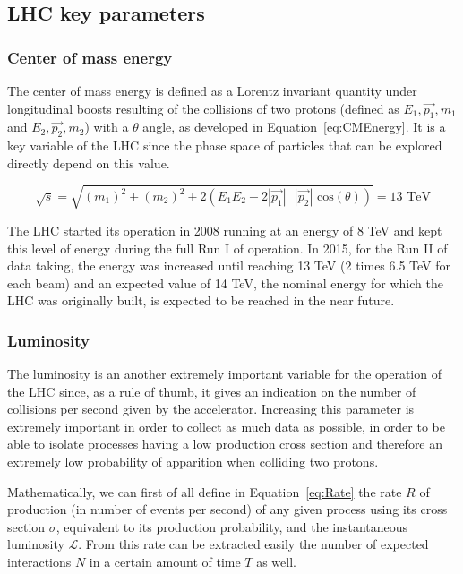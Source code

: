 \documentclass[a4paper, 10pt, openright]{report}
\begin{document}
\subsection{\ac{LHC} key parameters}\label{section:LHCParams}

\subsubsection{Center of mass energy} \label{subsection:CMEnergy}

The center of mass energy is defined as a Lorentz invariant quantity under longitudinal boosts resulting of the collisions of two protons (defined as $E_1, \overrightarrow{p_1}, m_1$ and $E_2, \overrightarrow{p_2}, m_2$) with a $\theta$ angle, as developed in Equation~\ref{eq:CMEnergy}. It is a key variable of the \ac{LHC} since the phase space of particles that can be explored directly depend on this value.

\begin{equation}
\label{eq:CMEnergy}
\sqrt{s} = \sqrt{(m_1)^2 + (m_2)^2 + 2 \left (E_1 E_2-2 |\overrightarrow{p_1}| \text{ } |\overrightarrow{p_2}| \text{ cos}(\theta) \right )} = 13 \text{ TeV}
\end{equation}

The LHC started its operation in 2008 running at an energy of 8 TeV and kept this level of energy during the full Run I of operation. In 2015, for the Run II of data taking, the energy was increased until reaching 13 TeV (2 times 6.5 TeV for each beam) and an expected value of 14 TeV, the nominal energy for which the \ac{LHC} was originally built, is expected to be reached in the near future.

\subsubsection{Luminosity} \label{subsection:Lumi}

The luminosity is an another extremely important variable for the operation of the \ac{LHC} since, as a rule of thumb, it gives an indication on the number of collisions per second given by the accelerator. Increasing this parameter is extremely important in order to collect as much data as possible, in order to be able to isolate processes having a low production cross section and therefore an extremely low probability of apparition when colliding two protons.

Mathematically, we can first of all define in Equation~\ref{eq:Rate} the rate $R$ of production (in number of events per second) of any given process using its cross section $\sigma$, equivalent to its production probability, and the instantaneous luminosity $\mathcal{L}$. From this rate can be extracted easily the number of expected interactions $N$ in a certain amount of time $T$ as well. 
\end{document}
